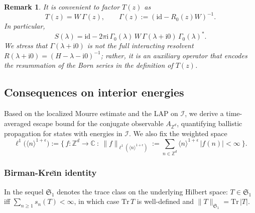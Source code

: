 \documentclass[10pt]{amsart} %
\newcommand{\1}{{\mathbb{I}}}
\numberwithin{equation}{section}
\newtheorem{remark}[theorem]{Remark}%
\begin{document}
\begin{remark}
It is convenient to factor $T(z)$ as
\[
T(z) = W\,\Gamma(z), \qquad
\Gamma(z):=(\mathrm{id}-R_0(z)W)^{-1}.
\]
In particular,
\[
S(\lambda)=\mathrm{id}-2\pi\mathrm{i}\,\Gamma_0(\lambda)\,W\,\Gamma(\lambda+\mathrm{i}0)\,\Gamma_0(\lambda)^*.
\]
We stress that $\Gamma(\lambda+\mathrm{i}0)$ is \emph{not} the full interacting resolvent
$R(\lambda+\mathrm{i}0)=(H-\lambda-\mathrm i0)^{-1}$; rather, it is an auxiliary operator that
encodes the resummation of the Born series in the definition of $T(z)$.
\end{remark}


\subsection{Consequences on interior energies}
Based on the localized Mourre estimate and the LAP on \(\mathcal{I}\),
we derive a time-averaged escape bound for the conjugate observable \(A_{\mathbb{Z}^d}\),
quantifying ballistic propagation for states with energies in \(\mathcal{I}\).
We also fix the weighted space
\[
\ell^{1}\!\big(\langle n\rangle^{1+\epsilon}\big)
:=\Big\{\,f:\mathbb{Z}^d\to\mathbb{C}\ :\
\|f\|_{\ell^{1}(\langle n\rangle^{1+\epsilon})}
:=\sum_{n\in \mathbb{Z}^d}\langle n\rangle^{1+\epsilon}\,|f(n)|<\infty\ \Big\}.
\]

\subsubsection{Birman-Kre\u{\i}n identity}\label{subsubsec:BK}

In the sequel $\mathfrak{S}_1$ denotes the trace class on the underlying Hilbert space:
$T\in\mathfrak{S}_1$ iff $\sum_{n\ge1} s_n(T)<\infty$, in which case $\mathrm{Tr}\,T$
is well-defined and $\|T\|_{\mathfrak{S}_1}=\mathrm{Tr}\,|T|$.
\end{document}
